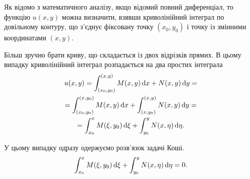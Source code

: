 Як відомо з математичного аналізу, якщо відомий повний диференціал, то функцію $u(x, y)$ можна визначити, взявши криволінійний інтеграл по довільному контуру, що з'єднує фіксовану точку $(x_0, y_0)$ і точку із змінними координатами $(x, y)$. \parvskip

Більш зручно брати криву, що складається із двох відрізків прямих. В цьому випадку криволінійний інтеграл розпадається на два простих інтеграла
\begin{multline*}
	u(x, y) = \int_{(x_0, y_0)}^{(x,y)} M(x,y) \mathop{}\!\mathrm{d} x + N(x, y) \mathop{}\!\mathrm{d} y = \\
	= \int_{(x_0, y_0)}^{(x,y_0)} M(x,y) \mathop{}\!\mathrm{d} x + \int_{(x,y_0)}^{(x,y)} N(x, y) \mathop{}\!\mathrm{d} y = \\
	= \int_{x_0}^{x} M(\xi,y_0) \mathop{}\!\mathrm{d} \xi + \int_{y_0}^{y} N(x, \eta) \mathop{}\!\mathrm{d} \eta.
\end{multline*}

У цьому випадку одразу одержуємо розв'язок задачі Коші.
\begin{equation*}
	\int_{x_0}^{x} M(\xi,y_0) \mathop{}\!\mathrm{d} \xi + \int_{y_0}^{y} N(x, \eta) \mathop{}\!\mathrm{d} \eta = 0.
\end{equation*}
